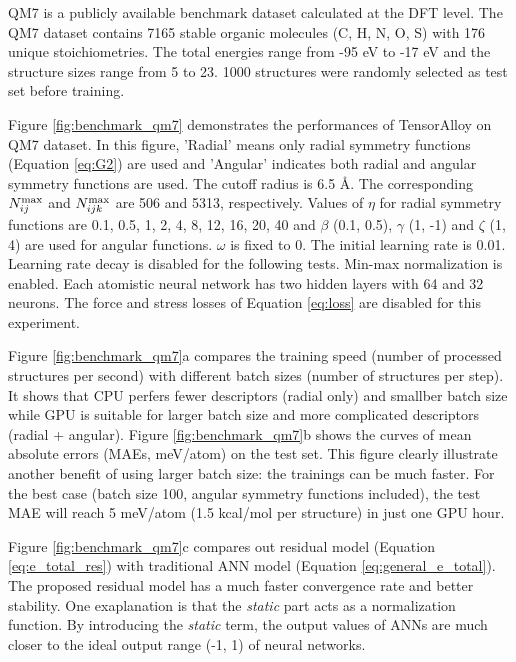 \documentclass[preprint]{revtex4-2}
\begin{document}
QM7\cite{QM7_1,QM7_2} is a publicly available benchmark dataset calculated at 
the DFT level. The QM7 dataset contains 7165 stable organic molecules 
(C, H, N, O, S) with 176 unique stoichiometries. The total energies range from 
-95 eV to -17 eV and the structure sizes range from 5 to 23. 1000 structures 
were randomly selected as test set before training.

Figure \ref{fig:benchmark_qm7} demonstrates the performances of 
TensorAlloy on QM7 dataset. In this figure, 'Radial' means only radial 
symmetry functions (Equation \ref{eq:G2}) are used and 'Angular' indicates both 
radial and angular symmetry functions are used. The cutoff radius is 6.5 \AA.
The corresponding $N_{ij}^{\mathrm{max}}$ and $N_{ijk}^{\mathrm{max}}$ are 506 and 5313, respectively.
Values of $\eta$ for radial symmetry functions are 0.1, 0.5, 1, 2, 4, 8, 12, 16, 
20, 40 and $\beta$ (0.1, 0.5), $\gamma$ (1, -1) and $\zeta$ (1, 4) are used for
angular functions. $\omega$ is fixed to 0. The initial learning rate is 0.01. 
Learning rate decay is disabled for the following tests. Min-max normalization
is enabled. Each atomistic neural network has two hidden layers with 64 and 32 
neurons. The force and stress losses of Equation \ref{eq:loss} are disabled for 
this experiment.

Figure \ref{fig:benchmark_qm7}a compares the training speed (number of processed 
structures per second) with different batch sizes (number of structures per 
step). It shows that CPU perfers fewer descriptors (radial only) and smallber 
batch size while GPU is suitable for larger batch size and more complicated 
descriptors (radial + angular). 
Figure \ref{fig:benchmark_qm7}b shows the curves of mean absolute errors 
(MAEs, meV/atom) on the test set. This figure clearly illustrate another benefit 
of using larger batch size: the trainings can be much faster. For the best case 
(batch size 100, angular symmetry functions included), the test MAE will reach 5 
meV/atom (1.5 kcal/mol per structure) in just one GPU hour. 

Figure \ref{fig:benchmark_qm7}c compares out residual model (Equation 
\ref{eq:e_total_res}) with traditional ANN model (Equation 
\ref{eq:general_e_total}). The proposed residual model has a much faster 
convergence rate and better stability. One exaplanation is that the 
\textit{static} part acts as a normalization function. By introducing the 
\textit{static} term, the output values of ANNs are much closer to the ideal 
output range (-1, 1) of neural networks.

% 
%
\end{document}

